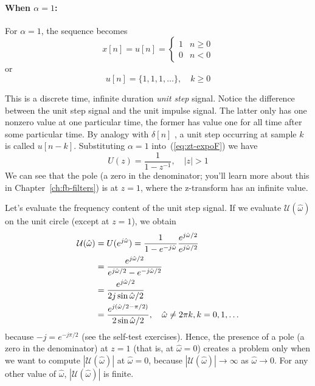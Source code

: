 \paragraph*{When $\alpha=1$:}

For $\alpha=1$, the sequence becomes
\begin{equation}
x[n] = u[n] = \left\{\begin{array}{ll}
                        1 & n \ge 0 \\
                        0 & n < 0
          \end{array}\right.
\end{equation}
or
\begin{equation}
u[n] = \{1, 1, 1, \ldots\}, \quad k \ge 0
\end{equation}

This is a discrete time, infinite duration \emph{unit step}
signal. Notice the difference between the unit step signal and the
unit impulse signal. The latter only has one nonzero value at one
particular time, the former has value one for all time after some
particular time. By analogy with $\delta[n]$ , a unit step occurring at
sample $k$ is called $u[n-k]$.  Substituting $\alpha=1$
into~(\ref{eq:zt-expoF}) we have
\begin{equation}
U(z)=\frac{1}{1-z^{-1}}, \quad |z|>1
\end{equation}
We can see that the pole (a zero in the denominator; you'll learn more
about this in Chapter~\ref{ch:fb-filters}) is at $z=1$, where the
z-transform has an infinite value.

Let's evaluate the frequency content of the unit step signal. If we
evaluate $\mathcal{U}(\hat{\omega})$ on the unit circle (except at
$z=1$), we obtain
\begin{align}
\mathcal{U}(\hat{\omega})
&= U(e^{j\hat{\omega}})
  =\frac{1}{1-e^{-j\hat{\omega}}}\frac{e^{j\hat{\omega}/2}}{e^{j\hat{\omega}/2}}
\notag\\
&= \frac{e^{j\hat{\omega}/2}}{e^{j\hat{\omega}/2}-e^{-j\hat{\omega}/2}} \notag\\
&= \frac{e^{j\hat{\omega}/2}}{2j\sin\hat{\omega}/2} \notag\\
&= \frac{e^{j(\hat{\omega}/2-\pi/2)}}{2\sin\hat{\omega}/2}, \quad \hat{\omega}\ne
2\pi k, k=0,1,\ldots
\end{align}
because $-j=e^{-j\pi/2}$ (see the self-test exercises).  Hence, the
presence of a pole (a zero in the denominator) at $z=1$ (that is, at
$\hat{\omega}=0$) creates a problem only when we want to compute
$|\mathcal{U}(\hat{\omega})|$ at $\hat{\omega}=0$, because
$|\mathcal{U}(\hat{\omega})|\rightarrow \infty$ as
$\hat{\omega}\rightarrow 0$. For any other value of $\hat{\omega}$,
$|\mathcal{U}(\hat{\omega})|$ is finite.

